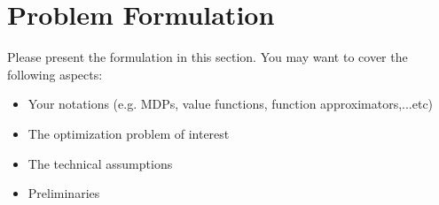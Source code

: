 \section{Problem Formulation}
\label{section:problem}
Please present the formulation in this section. You may want to cover the following aspects:
\begin{itemize}
    \item Your notations (e.g. MDPs, value functions, function approximators,...etc)
    \item The optimization problem of interest
    \item The technical assumptions
    \item Preliminaries
\end{itemize}
